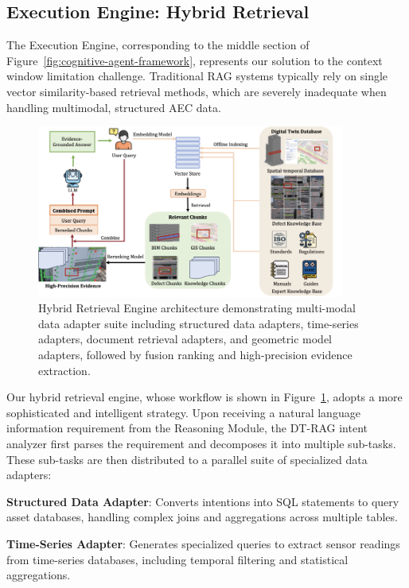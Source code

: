 \subsection{Execution Engine: Hybrid Retrieval}

The Execution Engine, corresponding to the middle section of Figure~\ref{fig:cognitive-agent-framework}, represents our solution to the context window limitation challenge. Traditional RAG systems typically rely on single vector similarity-based retrieval methods, which are severely inadequate when handling multimodal, structured AEC data.

\begin{figure}[htbp]
\centering
\includegraphics[width=0.9\textwidth]{figures/DefectGPT/hybrid_retrieval_engine.png}
\caption{Hybrid Retrieval Engine architecture demonstrating multi-modal data adapter suite including structured data adapters, time-series adapters, document retrieval adapters, and geometric model adapters, followed by fusion ranking and high-precision evidence extraction.}
\label{fig:hybrid-retrieval-engine}
\end{figure}

Our hybrid retrieval engine, whose workflow is shown in Figure~\ref{fig:hybrid-retrieval-engine}, adopts a more sophisticated and intelligent strategy. Upon receiving a natural language information requirement from the Reasoning Module, the DT-RAG intent analyzer first parses the requirement and decomposes it into multiple sub-tasks. These sub-tasks are then distributed to a parallel suite of specialized data adapters:

\textbf{Structured Data Adapter}: Converts intentions into SQL statements to query asset databases, handling complex joins and aggregations across multiple tables.

\textbf{Time-Series Adapter}: Generates specialized queries to extract sensor readings from time-series databases, including temporal filtering and statistical aggregations.

